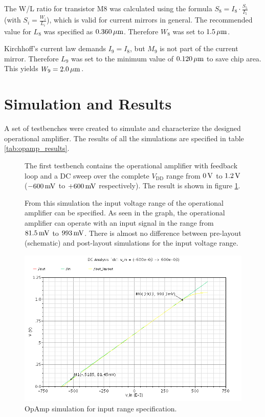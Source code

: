 \documentclass[parskip,oneside,colorbacktitle,10pt,accentcolor=tud1b,table]{tudreport}
\begin{document}
{The W/L ratio for transistor M8 was calculated using the formula $S_8 = I_8 \cdot \frac{S_5}{I_5}$ (with $S_i = \frac{W_i}{L_i}$), which is valid for current mirrors in general. The recommended value for $L_8$ was specified as $\unit[0.360]{\mu m}$. Therefore $W_8$ was set to $\unit[1.5]{\mu m}$.

Kirchhoff's current law demands $I_9 = I_8$, but $M_9$ is not part of the current mirror. Therefore $L_9$ was set to the minimum value of $\unit[0.120]{\mu m}$ to save chip area. This yields $W_9 = \unit[2.0]{\mu m}$.

\section{Simulation and Results}

A set of testbenches were created to simulate and characterize the designed operational amplifier. The results of all the simulations are specified in table \ref{tab:opamp_results}.

\begin{figure}[H]
	\begin{minipage}[t]{0.4\textwidth} 
	\setlength{\parskip}{\currentparskip} %
	\vspace{.3cm}
		The first testbench contains the operational amplifier with feedback loop and a DC sweep over the complete $V_\text{DD}$ range from $\unit[0]{V}$ to $\unit[1.2]{V}$ ($\unit[-600]{mV}$ to $\unit[+600]{mV}$ respectively). The result is shown in figure \ref{fig:opamp_sim1}. 
		
		From this simulation the input voltage range of the operational amplifier can be specified. As seen in the graph, the operational amplifier can operate with an input signal in the range from $\unit[81.5]{mV}$ to $\unit[993]{mV}$. There is almost no difference between pre-layout (schematic) and post-layout simulations for the input voltage range.
	\end{minipage}
	\begin{minipage}[t]{0.55\textwidth} 
		\begin{center}
			\includegraphics[scale=0.4]{opamp_sim1}
		    \caption{OpAmp simulation for input range specification.}
		    \label{fig:opamp_sim1}		
		\end{center}
	\end{minipage}
\end{figure}

}
\end{document}
